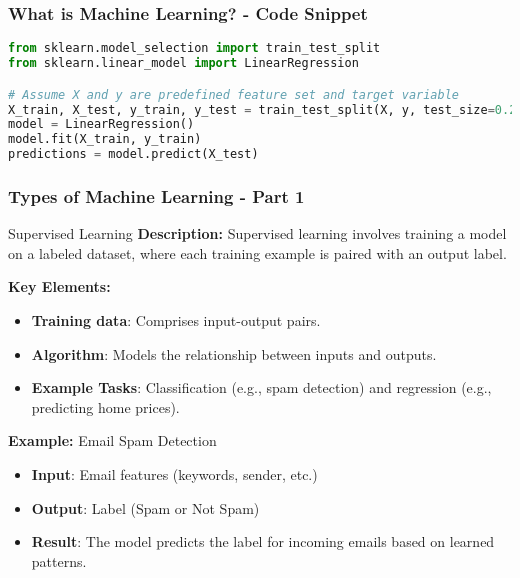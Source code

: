 \documentclass[aspectratio=169]{beamer}
\begin{document}
\begin{frame}[fragile]
    \frametitle{What is Machine Learning? - Code Snippet}
    \begin{lstlisting}[language=Python]
from sklearn.model_selection import train_test_split
from sklearn.linear_model import LinearRegression

# Assume X and y are predefined feature set and target variable
X_train, X_test, y_train, y_test = train_test_split(X, y, test_size=0.2)
model = LinearRegression()
model.fit(X_train, y_train)
predictions = model.predict(X_test)
    \end{lstlisting}
\end{frame}

\begin{frame}[fragile]
    \frametitle{Types of Machine Learning - Part 1}
    \begin{block}{Supervised Learning}
        \textbf{Description:}
        Supervised learning involves training a model on a labeled dataset, where each training example is paired with an output label.
        
        \textbf{Key Elements:}
        \begin{itemize}
            \item \textbf{Training data}: Comprises input-output pairs.
            \item \textbf{Algorithm}: Models the relationship between inputs and outputs.
            \item \textbf{Example Tasks}: Classification (e.g., spam detection) and regression (e.g., predicting home prices).
        \end{itemize}
        
        \textbf{Example:} Email Spam Detection
        \begin{itemize}
            \item \textbf{Input}: Email features (keywords, sender, etc.)
            \item \textbf{Output}: Label (Spam or Not Spam)
            \item \textbf{Result}: The model predicts the label for incoming emails based on learned patterns.
        \end{itemize}
    \end{block}
\end{frame}
\end{document}
